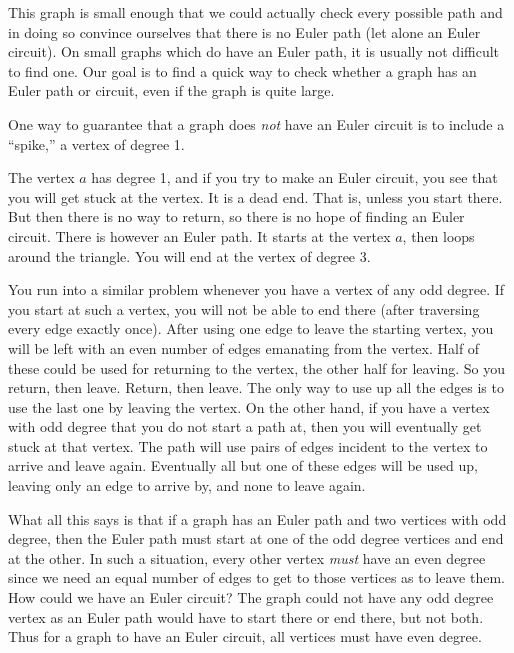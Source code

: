 \documentclass[10pt,]{book}
\theoremstyle{plain}
\theoremstyle{definition}
\theoremstyle{definition}
\theoremstyle{definition}
\numberwithin{equation}{chapter}
\newcommand{\vtx}[2]{node[fill,circle,inner sep=0pt, minimum size=4pt,label=#1:#2]{}}
\renewcommand{\v}{\vtx{above}{}}
\begin{document}
%
\par

This graph is small enough that we could actually check every possible path and in doing so convince ourselves that there is no Euler path (let alone an Euler circuit). On small graphs which do have an Euler path, it is usually not difficult to find one. Our goal is to find a quick way to check whether a graph has an Euler path or circuit, even if the graph is quite large.
%
\par

One way to guarantee that a graph does \emph{not} have an Euler circuit is to include a ``spike,'' a vertex of degree 1.
%
\leavevmode%
\begin{figure}
\centering
{
}
\end{figure}
\par

The vertex \(a\) has degree 1, and if you try to make an Euler circuit, you see that you will get stuck at the vertex. It is a dead end. That is, unless you start there. But then there is no way to return, so there is no hope of finding an Euler circuit. There is however an Euler path. It starts at the vertex \(a\), then loops around the triangle. You will end at the vertex of degree 3.
%
\par

You run into a similar problem whenever you have a vertex of any odd degree. If you start at such a vertex, you will not be able to end there (after traversing every edge exactly once). After using one edge to leave the starting vertex, you will be left with an even number of edges emanating from the vertex. Half of these could be used for returning to the vertex, the other half for leaving. So you return, then leave. Return, then leave. The only way to use up all the edges is to use the last one by leaving the vertex. On the other hand, if you have a vertex with odd degree that you do not start a path at, then you will eventually get stuck at that vertex. The path will use pairs of edges incident to the vertex to arrive and leave again. Eventually all but one of these edges will be used up, leaving only an edge to arrive by, and none to leave again.
%
\par

What all this says is that if a graph has an Euler path and two vertices with odd degree, then the Euler path must start at one of the odd degree vertices and end at the other. In such a situation, every other vertex \emph{must} have an even degree since we need an equal number of edges to get to those vertices as to leave them. How could we have an Euler circuit? The graph could not have any odd degree vertex as an Euler path would have to start there or end there, but not both. Thus for a graph to have an Euler circuit, all vertices must have even degree.
%
\par
\end{document}

